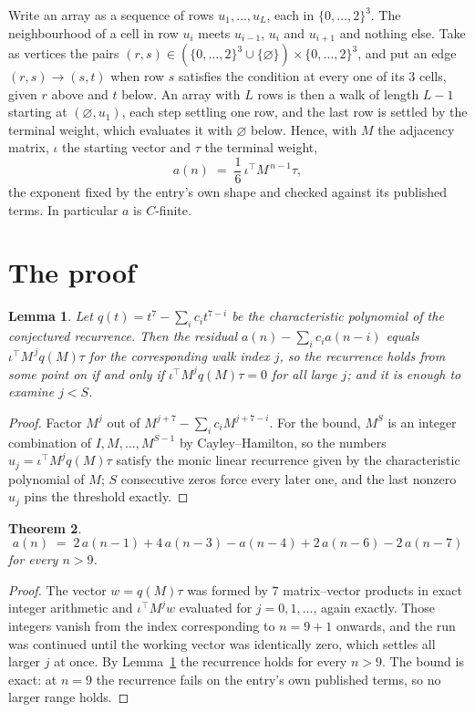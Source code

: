 \documentclass[11pt,a4paper]{article}
\theoremstyle{plain}
\newtheorem{theorem}{Theorem}
\newtheorem{lemma}[theorem]{Lemma}
\theoremstyle{definition}
\begin{document}
Write an array as a sequence of rows $u_1,\dots,u_L$, each in
$\{0,\dots,2\}^{3}$. The neighbourhood of a cell in row $u_i$ meets $u_{i-1}$,
$u_i$ and $u_{i+1}$ and nothing else. Take as vertices the pairs
$(r,s)\in(\{0,\dots,2\}^{3}\cup\{\varnothing\})\times\{0,\dots,2\}^{3}$,
and put an edge $(r,s)\to(s,t)$ when row $s$ satisfies the condition at every one of its
$3$ cells, given $r$ above and $t$ below. An array with $L$ rows is then a walk of length
$L-1$ starting at $(\varnothing,u_1)$, each step settling one row, and the last row is
settled by the terminal weight, which evaluates it with $\varnothing$ below. Hence,
with $M$ the adjacency matrix, $\iota$ the starting vector and $\tau$ the terminal weight,
\[
a(n)\;=\;\frac{1}{6}\,\iota^{\!\top}M^{\,n-1}\tau ,
\]
the exponent fixed by the entry's own shape and checked against its published terms. In
particular $a$ is $C$-finite.

\section{The proof}

\begin{lemma}\label{lem:crit}
Let $q(t)=t^{7}-\sum_i c_it^{7-i}$ be the characteristic polynomial of the
conjectured recurrence. Then the residual $a(n)-\sum_ic_ia(n-i)$ equals
$\iota^{\!\top}M^{\,j}q(M)\tau$ for the corresponding walk index $j$, so the
recurrence holds from some point on if and only if $\iota^{\!\top}M^{j}q(M)\tau=0$ for all
large $j$; and it is enough to examine $j<S$.
\end{lemma}

\begin{proof}
Factor $M^{j}$ out of $M^{j+7}-\sum_ic_iM^{j+7-i}$. For the bound, $M^{S}$
is an integer combination of $I,M,\dots,M^{S-1}$ by Cayley--Hamilton, so the numbers
$u_j=\iota^{\!\top}M^{j}q(M)\tau$ satisfy the monic linear recurrence given by the
characteristic polynomial of $M$; $S$ consecutive zeros force every later one, and the last
nonzero $u_j$ pins the threshold exactly.
\end{proof}

\begin{theorem}
\[
a(n)\;=\;2\,a(n-1) + 4\,a(n-3) - a(n-4) + 2\,a(n-6) - 2\,a(n-7)
\]
for every $n>9$.
\end{theorem}

\begin{proof}
The vector $w=q(M)\tau$ was formed by $7$ matrix--vector products in exact integer
arithmetic and $\iota^{\!\top}M^{j}w$ evaluated for $j=0,1,\dots$, again exactly. Those
integers vanish from the index corresponding to $n=9+1$ onwards, and the run was
continued until the working vector was identically zero, which settles all larger $j$ at once.
By Lemma~\ref{lem:crit} the recurrence holds for every $n>9$. The bound is exact: at $n=9$ the recurrence fails on the entry's own published terms, so no larger range holds.
\end{proof}
\end{document}
